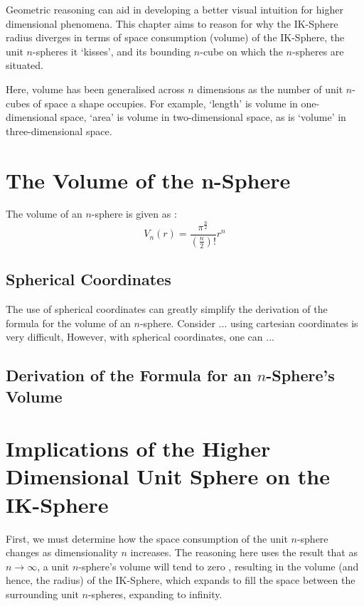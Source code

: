 Geometric reasoning can aid in developing a better visual intuition for higher dimensional phenomena. This chapter aims to reason for why the IK-Sphere radius diverges in terms of space consumption (volume) of the IK-Sphere, the unit $n$-spheres it `kisses', and its bounding $n$-cube on which the $n$-spheres are situated.

\begin{definition}[Volume]
    Here, volume has been generalised across $n$ dimensions as the number of unit $n$-cubes of space a shape occupies. For example, `length' is volume in one-dimensional space, `area' is volume in two-dimensional space, as is `volume' in three-dimensional space. 
\end{definition}

\section{The Volume of the n-Sphere}
The volume of an $n$-sphere is given as \cite{formula_n_sphere}:
\begin{equation}\label{eq:vol of sphere}
    V_n(r)=\frac{\pi^{\frac{n}{2}}}{\left(\frac{n}{2}\right)!}r^n
\end{equation}

\subsection{Spherical Coordinates}
The use of spherical coordinates can greatly simplify the derivation of the formula for the volume of an $n$-sphere. Consider ... using cartesian coordinates is very difficult, However, with spherical coordinates, one can ...

\subsection{Derivation of the Formula for an $n$-Sphere's Volume}

\section{Implications of the Higher Dimensional Unit Sphere on the IK-Sphere}
First, we must determine how the space consumption of the unit $n$-sphere changes as dimensionality $n$ increases. The reasoning here uses the result that as $n \to \infty$, a unit $n$-sphere's volume will tend to zero \cite{athreya2008unit}, resulting in the volume (and hence, the radius) of the IK-Sphere, which expands to fill the space between the surrounding unit $n$-spheres, expanding to infinity. 

